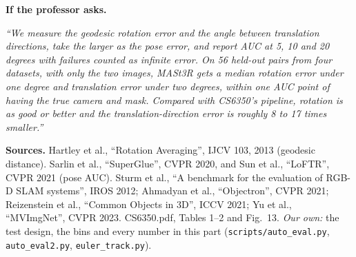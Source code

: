 \documentclass[11pt,a4paper]{article}
\newenvironment{viva}{\par\medskip\noindent\colorbox{gray!12}{\parbox{\dimexpr\linewidth-2\fboxsep}{\textbf{If the professor asks.}\ }}\par\begingroup\itshape}{\endgroup\par\medskip}
\begin{document}
\begin{viva}
``We measure the geodesic rotation error and the angle between translation directions, take the larger as the pose error, and report AUC at 5, 10 and 20 degrees with failures counted as infinite error. On 56 held-out pairs from four datasets, with only the two images, MASt3R gets a median rotation error under one degree and translation error under two degrees, within one AUC point of having the true camera and mask. Compared with CS6350's pipeline, rotation is as good or better and the translation-direction error is roughly 8 to 17 times smaller.''
\end{viva}

\noindent\textbf{Sources.} Hartley et al., ``Rotation Averaging'', IJCV 103, 2013 (geodesic distance). Sarlin et al., ``SuperGlue'', CVPR 2020, and Sun et al., ``LoFTR'', CVPR 2021 (pose AUC). Sturm et al., ``A benchmark for the evaluation of RGB-D SLAM systems'', IROS 2012; Ahmadyan et al., ``Objectron'', CVPR 2021; Reizenstein et al., ``Common Objects in 3D'', ICCV 2021; Yu et al., ``MVImgNet'', CVPR 2023. CS6350.pdf, Tables 1--2 and Fig.~13. \emph{Our own:} the test design, the bins and every number in this part (\texttt{scripts/auto\_eval.py}, \texttt{auto\_eval2.py}, \texttt{euler\_track.py}).
\end{document}

